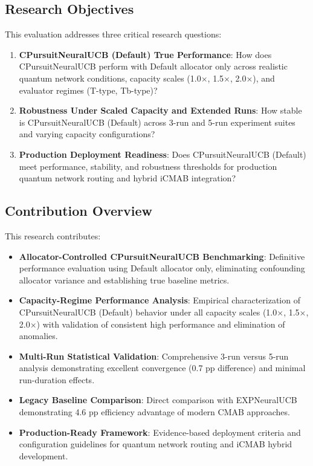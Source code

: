 \documentclass[12pt,a4paper]{article}
\begin{document}
\subsection{Research Objectives}

This evaluation addresses three critical research questions:

\begin{enumerate}
    \item \textbf{CPursuitNeuralUCB (Default) True Performance}: How does CPursuitNeuralUCB perform with Default allocator only across realistic quantum network conditions, capacity scales (1.0$\times$, 1.5$\times$, 2.0$\times$), and evaluator regimes (T-type, Tb-type)?
    
    \item \textbf{Robustness Under Scaled Capacity and Extended Runs}: How stable is CPursuitNeuralUCB (Default) across 3-run and 5-run experiment suites and varying capacity configurations?
    
    \item \textbf{Production Deployment Readiness}: Does CPursuitNeuralUCB (Default) meet performance, stability, and robustness thresholds for production quantum network routing and hybrid iCMAB integration?
\end{enumerate}

\subsection{Contribution Overview}

This research contributes:

\begin{itemize}
    \item \textbf{Allocator-Controlled CPursuitNeuralUCB Benchmarking}: Definitive performance evaluation using Default allocator only, eliminating confounding allocator variance and establishing true baseline metrics.
    
    \item \textbf{Capacity-Regime Performance Analysis}: Empirical characterization of CPursuitNeuralUCB (Default) behavior under all capacity scales (1.0$\times$, 1.5$\times$, 2.0$\times$) with validation of consistent high performance and elimination of anomalies.
    
    \item \textbf{Multi-Run Statistical Validation}: Comprehensive 3-run versus 5-run analysis demonstrating excellent convergence (0.7 pp difference) and minimal run-duration effects.
    
    \item \textbf{Legacy Baseline Comparison}: Direct comparison with EXPNeuralUCB demonstrating 4.6 pp efficiency advantage of modern CMAB approaches.
    
    \item \textbf{Production-Ready Framework}: Evidence-based deployment criteria and configuration guidelines for quantum network routing and iCMAB hybrid development.
\end{itemize}
\end{document}
